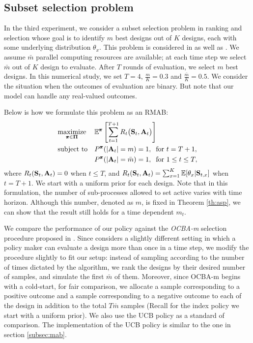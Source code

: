 
\subsection{Subset selection problem}
In the third experiment, we consider a subset selection problem in ranking and selection whose goal is to identify $m$ best designs out of $K$ designs, each with some underlying distribution $\theta_x$. This problem is considered in \citep{chen2008} as well as \citep{Law1985}. We assume $\bar{m}$ parallel computing resources are available; at each time step we select $\bar{m}$ out of $K$ design to evaluate. After $T$ rounds of evaluation, we select $m$ best designs. In this numerical study, we set $T=4$, $\frac{m}{K}=0.3$ and $\frac{\bar{m}}{K}=0.5$. We consider the situation when the outcomes of evaluation are binary. But note that our model can handle any real-valued outcomes.

Below is how we formulate this problem as an RMAB:
\begin{equation}\label{prime_ss}
\begin{aligned}
& \underset{\pmb{\pi}\in\mathbf{\Pi}}{\text{maximize}}
& & \mathbb{E}^{\pmb{\pi}}\left[\sum_{t=1}^{T+1}R_t\big(\mathbf{S}_t,\mathbf{A}_t\big)\right] \\
& \text{subject to}
& & P^{\pmb{\pi}}(|\mathbf{A}_t|=m)=1, \; \; \text{for }t=T+1,\\
& & & P^{\pmb{\pi}}(|\mathbf{A}_t|=\bar{m})=1, \; \; \text{for }1\leq t\leq T,
\end{aligned}
\end{equation}
where $R_t(\mathbf{S}_t,\mathbf{A}_t)=0$ when $t\leq T$, and $R_t(\mathbf{S}_t,\mathbf{A}_t)=\sum_{x=1}^{K}\mathbb{E}[\theta_x|\mathbf{S}_{t,x}]$ when $t= T+1$. We start with a uniform prior for each design. Note that in this formulation, the number of sub-processes allowed to set active varies with time horizon. Although this number, denoted as $m$, is fixed in Theorem \ref{th:asp}, we can show that the result still holds for a time dependent $m_t$.

We compare the performance of our policy against the \textit{OCBA-m} selection procedure proposed in \citep{chen2008}. Since \citep{chen2008} considers a slightly different setting in which a policy maker can evaluate a design more than once in a time step, we modify the procedure slightly to fit our setup: instead of sampling according to the number of times dictated by the algorithm, we rank the designs by their desired number of samples, and simulate the first $\bar{m}$ of them.  Moreover, since OCBA-m begins with a cold-start, for fair comparison, we allocate a sample corresponding to a positive outcome and a sample corresponding to a negative outcome to each of the design in addition to the total $T\bar{m}$ samples (Recall for the index policy we start with a uniform prior). We also use the UCB policy as a standard of comparison. The implementation of the UCB policy is similar to the one in section \ref{subsec:mab}.

